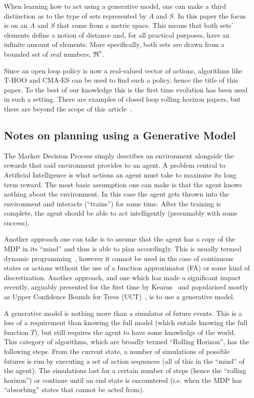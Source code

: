 \documentclass[conference]{IEEEtran}
\begin{document}
When learning how to act using a generative model, one can make a third distinction as to the type of sets represented by $A$ and $S$. In this paper the focus is on an $A$ and $S$ that come from a metric space. This means  that both sets' elements define a notion of distance and, for all practical purposes, have an infinite amount of elements. More specifically, both sets are drawn from a bounded set of real numbers, $\Re^n$.

Since an open loop policy is now a real-valued vector of actions, algorithms like T-HOO and CMA-ES can be used to find such a policy, hence the title of this paper. To the best of our knowledge this is the first time evolution has been used in such a setting. There are examples of closed loop rolling horizon papers, but these are beyond the scope of this article~\cite{xiang2012differential,samothrakis2010planning}.



\subsection{Notes on planning using a Generative Model}

The Markov Decision Process simply describes an environment alongside the rewards that said environment provides to an agent. A problem central to Artificial Intelligence is what actions an agent must take to maximise its long term reward. The most basic assumption one can make is that the agent knows nothing about the environment. In this case the agent gets thrown into the environment and interacts (``trains'') for some time. After the training is complete, the agent should be able to act intelligently (presumably with some success).

Another approach one can take is to assume that the agent has a copy of the MDP in its ``mind'' and thus is able to plan accordingly. This is usually termed dynamic programming~\cite{sutton1998reinforcement}, however it cannot be used in the case of continuous states or actions without the use of a function approximator (FA) or some kind of discretization. Another approach, and one which has made a significant impact recently, arguably presented for the first time by Kearns~\cite{citeulike:1584916} and popularised mostly as Upper Confidence Bounds for Trees (UCT)~\cite{kocsis2006bandit}, is to use a generative model.

A generative model is nothing more than a simulator of future events. This is a less of a requirement than knowing the full model (which entails knowing the full function $T$), but still requires the agent to have some knowledge of the world. This category of algorithms, which are broadly termed ``Rolling Horizon'', has the following steps. From the current state, a number of simulations of possible futures is run by executing a set of action sequences (all of this in the ``mind'' of the agent). The simulations last for a certain number of steps (hence the ``rolling horizon'') or continue until an end state is encountered (i.e. when the MDP has ``absorbing'' states that cannot be acted from).
\end{document}
